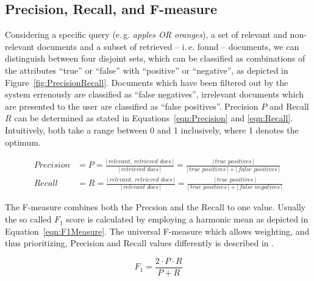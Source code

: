 
\subsection{Precision, Recall, and F-measure} \label{sec:Introduction:PrRcF1}

Considering a specific query (e.\,g. \textit{apples OR oranges}), a set of relevant and non-relevant documents and a subset of retrieved -- i.\,e. found -- documents, we can distinguish between four disjoint sets, which can be classified as combinations of the attributes ``true'' or ``false'' with ``positive'' or ``negative'', as depicted in Figure~\ref{fig:PrecisionRecall}. Documents which have been filtered out by the system errenously are classified as ``false negatives'', irrelevant documents which are presented to the user are classified as ``false positives''. Precision $P$ and Recall $R$ can be determined as stated in Equations~\ref{eqn:Precision} and \ref{eqn:Recall}. Intuitively, both take a range between 0 and 1 inclusively, where 1 denotes the optimum.

\begin{align}
%	
	\textit{Precision} &= P = \frac{\left|\,\textit{relevant, retrieved docs}\,\right|}{\left|\,\textit{retrieved docs}\,\right|} = \frac{\left|\,\textit{true positives}\,\right|}{\left|\,\textit{true positives}\,\right| + \left|\,\textit{false positives}\,\right|}
	\label{eqn:Precision} \\[5mm]
%	
	\textit{Recall} &= R = \frac{\left|\,\textit{relevant, retrieved docs}\,\right|}{\left|\,\textit{relevant docs}\,\right|} = \frac{\left|\,\textit{true positives}\,\right|}{\left|\,\textit{true positives}\,\right| + \left|\,\textit{false negatives}\,\right|}
	\label{eqn:Recall}
%	
\end{align}

The F-measure combines both the Precsion and the Recall to one value. Usually the so called $F_1$ score is calculated by employing a harmonic mean as depicted in Equation~\ref{eqn:F1Measure}. The universal F-measure which allows weighting, and thus prioritizing, Precision and Recall values differently is described in \cite[p.\,156]{Manning:2009}. 

\begin{equation}
	F_1 = \frac{2 \cdot P \cdot R}{P + R}
	\label{eqn:F1Measure}
\end{equation}


